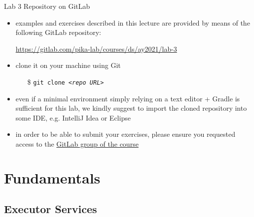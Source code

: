 \documentclass{beamer}\mode<presentation>{\usetheme{AMSBolognaFC}}
\newcommand{\labN}{3}
\newcommand{\labGroup}{https://gitlab.com/pika-lab/courses/ds/ay2021}
\newcommand{\labRepo}{\labGroup/lab-\labN}
\begin{document}
\begin{frame}[c]{Lab \labN{} Repository on GitLab}

	\begin{itemize}
		\item examples and exercises described in this lecture are provided by means of the following GitLab repository:
		\begin{center}
			\url{\labRepo}
		\end{center}

		\vfill

		\item clone it on your machine using Git
		\begin{itemize}
		    \item[\$] \texttt{git clone \textit{<repo URL>}}
		\end{itemize}

		\vfill

		\item even if a minimal environment simply relying on a text editor + Gradle is sufficient for this lab, we kindly suggest to import the cloned repository into some IDE, e.g. IntelliJ Idea or Eclipse

		\vfill

		\item in order to be able to submit your exercises, please ensure you requested access to the \href{\labGroup}{GitLab group of the course}
	\end{itemize}

\end{frame}

\section{Fundamentals}

\subsection{Executor Services}
\end{document}
